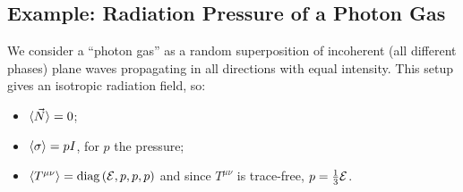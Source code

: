\documentclass[../Main.tex]{subfiles}
\begin{document}
\subsection{Example: Radiation Pressure of a Photon Gas}
We consider a ``photon gas'' as a random superposition of incoherent (all different phases) plane waves propagating in all directions with equal intensity. This setup gives an isotropic radiation field, so:
\begin{itemize}
    \item $\langle\vec{N}\rangle = 0$;
    \item $\langle\sigma\rangle = pI$, for $p$ the pressure;
    \item $\langle T^{\mu\nu}\rangle = \operatorname{diag}\left(\mathcal{E}, p, p, p\right)$ and since $T^{\mu\nu}$ is trace-free, $p = \frac13 \mathcal{E}$.
\end{itemize}
\end{document}
